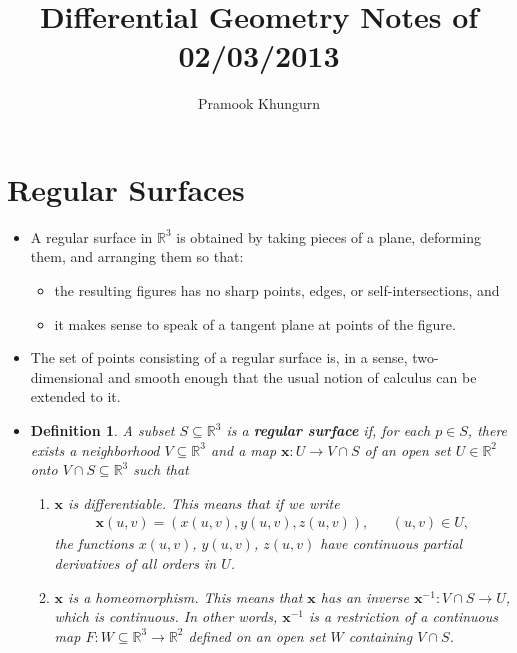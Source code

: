 \documentclass[10pt]{article}
\title{Differential Geometry Notes of 02/03/2013}
\author{Pramook Khungurn}
\newtheorem{definition}[lemma]{Definition}
\newcommand{\ve}[1]{\mathbf{#1}}
\newcommand{\ra}{\rightarrow}
\newcommand{\Real}{\mathbb{R}}
\newcommand{\sseq}{\subseteq}
\begin{document}
	\maketitle

  \section{Regular Surfaces} %
  \label{sec:regular_surfaces}

  \begin{itemize}
    \item A regular surface in $\Real^3$ is obtained by taking pieces of a plane, deforming them, and arranging them so that:
    \begin{itemize}
      \item the resulting figures has no sharp points, edges, or self-intersections, and
      \item it makes sense to speak of a tangent plane at points of the figure.
    \end{itemize} 

    \item The set of points consisting of a regular surface is, in a sense, two-dimensional and smooth enough that the usual notion of calculus can be extended to it.

    \item \begin{definition} \label{regular-surface}
      A subset $S \sseq \Real^3$ is a {\bf regular surface} if, for each $p \in S$, there exists a neighborhood $V \sseq \Real^3$ and a map $\ve{x} : U \ra V \cap S$ of an open set $U \in \Real^2$ onto $V \cap S \sseq \Real^3$ such that
      \begin{enumerate}
        \item $\ve{x}$ is differentiable. This means that if we write
        \begin{align*}
          \ve{x}(u,v) = (x(u,v), y(u,v), z(u,v)), & & (u,v) \in U,
        \end{align*}
        the functions $x(u,v)$, $y(u,v)$, $z(u,v)$ have continuous partial derivatives of all orders in $U$.

        \item $\ve{x}$ is a homeomorphism. This means that $\ve{x}$ has an inverse $\ve{x}^{-1}: V \cap S \ra U$, which is continuous. In other words, $\ve{x}^{-1}$ is a restriction of a continuous map $F: W \sseq \Real^3 \ra \Real^2$ defined on an open set $W$ containing $V \cap S$.


\end{enumerate}
\end{definition}
\end{itemize}
\end{document}
